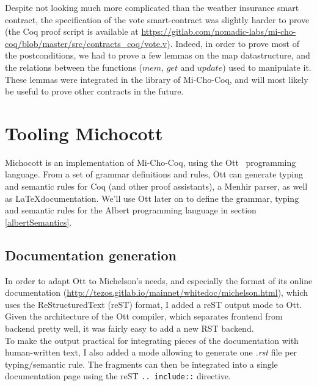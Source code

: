\documentclass{report}
\begin{document}
Despite not looking much more complicated than the weather insurance smart contract, the specification of the vote smart-contract was slightly harder to prove (the Coq proof script is available at \url{https://gitlab.com/nomadic-labs/mi-cho-coq/blob/master/src/contracts_coq/vote.v}). Indeed, in order to prove most of the postconditions, we had to prove a few lemmas on the map datastructure, and the relations between the functions ($mem$, $get$ and $update$) used to manipulate it. These lemmas were integrated in the library of Mi-Cho-Coq, and will most likely be useful to prove other contracts in the future.


\section{Tooling Michocott}

Michocott is an implementation of Mi-Cho-Coq, using the Ott~\cite{ottLang} programming language. From a set of grammar definitions and rules, Ott can generate typing and semantic rules for Coq (and other proof assistants), a Menhir parser, as well as \LaTeX documentation. We'll use Ott later on to define the grammar, typing and semantic rules for the Albert programming language in section \ref{albertSemantics}.

\subsection{Documentation generation}

In order to adapt Ott to Michelson's needs, and especially the format of its online documentation (\url{http://tezos.gitlab.io/mainnet/whitedoc/michelson.html}), which uses the ReStructuredText (reST) format, I added a reST output mode to Ott. Given the architecture of the Ott compiler, which separates frontend from backend pretty well, it was fairly easy to add a new RST backend.\\
To make the output practical for integrating pieces of the documentation with human-written text, I also added a mode allowing to generate one \textit{.rst} file per typing/semantic rule. The fragments can then be integrated into a single documentation page using the reST \texttt{.. include::} directive.\\
\end{document}

